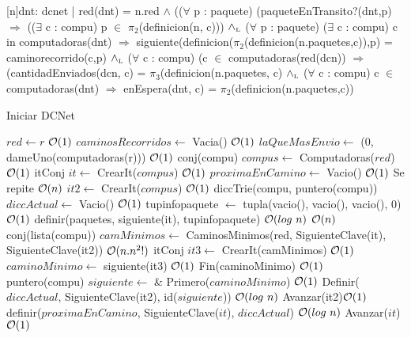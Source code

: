 \begin{Representacion}
 
  [n]{dnt: dcnet | red(dnt) = n.red  $\land$ (($\forall$ p : paquete) (paqueteEnTransito?(dnt,p) $\Rightarrow$ (($\exists$ c : compu) p $\in$ $\pi_2$(definicion(n, c))) $\land_{\mathrm{\scriptscriptstyle{L}}}$
 ($\forall$ p : paquete) ($\exists$ c : compu) c in computadoras(dnt) $\Rightarrow$ siguiente(definicion($\pi_2$(definicion(n.paquetes,c)),p) = caminorecorrido(c,p)  $\land_{\mathrm{\scriptscriptstyle{L}}}$
($\forall$ c : compu) (c $\in$ computadoras(red(dcn)) $\Rightarrow$ (cantidadEnviados(dcn, c) = $\pi_3$(definicion(n.paquetes, c) $\land_{\mathrm{\scriptscriptstyle{L}}}$ 
($\forall$ c : compu) c $\in$ computadoras(dnt) $\Rightarrow$ enEspera(dnt, c) = $\pi_2$(definicion(n.paquetes,c))}

\end{Representacion}



\begin{Algoritmos}


\begin{algorithm}
\caption{Iniciar DCNet}
\begin{algorithmic}[1]
  \State $red \gets r$ \Comment $\mathcal{O}(1)$
  \State $caminosRecorridos \gets$ Vacia() \Comment $\mathcal{O}(1)$ 
  \State $laQueMasEnvio \gets$ (0, dameUno(computadoras(r))) \Comment $\mathcal{O}(1)$
  \State conj(compu) $compus \gets$ Computadoras($red$) \Comment $\mathcal{O}(1)$
   \State itConj $it \gets$ CrearIt($compus$) \Comment $\mathcal{O}(1)$
  \State $proximaEnCamino \gets$ Vacio() \Comment $\mathcal{O}(1)$
   \Comment Se repite $\mathcal{O}(n)$
    \State {} $it2 \gets$ CrearIt($compus$) \Comment $\mathcal{O}(1)$
    \State diccTrie(compu, puntero(compu)) $diccActual \gets$ Vacio() \Comment $\mathcal{O}(1)$
	\State {} tupinfopaquete $\gets$ tupla(vacio(), vacio(), vacio(), 0) \Comment $\mathcal{O}(1)$	
	\State definir(paquetes, siguiente(it), tupinfopaquete) \Comment $\mathcal{O}(log \ n)$
     \Comment $\mathcal{O}(n)$
      \State conj(lista(compu)) $camMinimos \gets$ CaminosMinimos(red, SiguienteClave(it), SiguienteClave(it2)) \Comment $\mathcal{O}(n.n^2!)$
      \State itConj $it3 \gets$ CrearIt(camMinimos) \Comment $\mathcal{O}(1)$
      \State $caminoMinimo \gets$ siguiente(it3) \Comment $\mathcal{O}(1)$
      \State Fin(caminoMinimo) \Comment $\mathcal{O}(1)$
      \State puntero(compu) $siguiente \gets$ \& Primero($caminoMinimo$) \Comment $\mathcal{O}(1)$
      \State Definir($diccActual$, SiguienteClave(it2), id($siguiente$)) \Comment $\mathcal{O}(log \ n)$
      \State Avanzar(it2)\Comment $\mathcal{O}(1)$
    \EndWhile
    \State definir($proximaEnCamino$, SiguienteClave($it$), $diccActual$) \Comment $\mathcal{O}(log \ n)$
    \State Avanzar($it$) \Comment $\mathcal{O}(1)$
  \EndWhile
   

\end{algorithmic}
\end{algorithm}
\end{Algoritmos}
